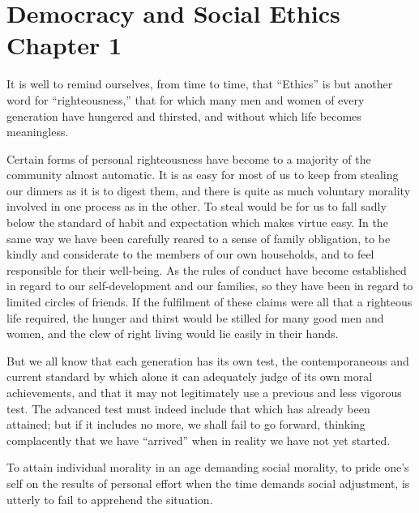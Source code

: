 
\author{Jane Addams}
\chapter[Jane Addams -- Democracy and Social Ethics, chap.
1]{Democracy and Social Ethics\\\smaller Chapter 1}



It is well to remind ourselves, from time to time, that
``Ethics'' is but another word for ``righteousness,'' that for which
many men and women of every generation have hungered and thirsted, and
without which life becomes meaningless.

Certain forms of personal righteousness have become to a majority of
the community almost automatic. It is as easy for most of us to keep
from stealing our dinners as it is to digest them, and there is quite
as much voluntary morality involved in one process as in the other. To
steal would be for us to fall sadly below the standard of habit and
expectation which makes virtue easy. In the same way we have been
carefully reared to a sense  of family obligation, to be
kindly and considerate to the members of our own households, and to
feel responsible for their well-being. As the rules of conduct have
become established in regard to our self-development and our families,
so they have been in regard to limited circles of friends. If the
fulfilment of these claims were all that a righteous life required,
the hunger and thirst would be stilled for many good men and women,
and the clew of right living would lie easily in their hands.

But we all know that each generation has its own test, the
contemporaneous and current standard by which alone it can adequately
judge of its own moral achievements, and that it may not legitimately
use a previous and less vigorous test. The advanced test must indeed
include that which has already been attained; but if it includes no
more, we shall fail to go forward, thinking complacently that we have
``arrived'' when in reality we have not yet started.

To attain individual morality in an age  demanding social
morality, to pride one's self on the results of personal effort when
the time demands social adjustment, is utterly to fail to apprehend
the situation.

